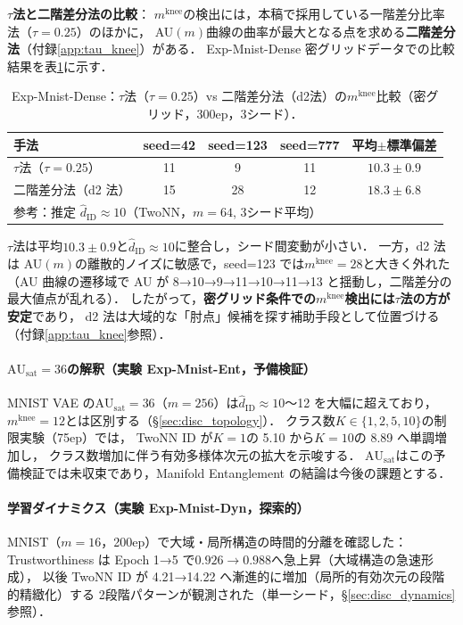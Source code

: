 \documentclass[11pt,a4paper]{jsarticle}
\newcommand{\AUsat}{\mathrm{AU}_{\mathrm{sat}}}
\newcommand{\mknee}{m^{\mathrm{knee}}}
\begin{document}
\noindent
\textbf{$\tau$法と二階差分法の比較}：
$\mknee$の検出には，本稿で採用している一階差分比率法（$\tau = 0.25$）のほかに，
AU$(m)$曲線の曲率が最大となる点を求める\textbf{二階差分法}（付録\ref{app:tau_knee}）がある．
Exp-Mnist-Dense 密グリッドデータでの比較結果を表\ref{tab:el_knee_compare}に示す．

\begin{table}[H]
\centering
\caption{Exp-Mnist-Dense：$\tau$法（$\tau=0.25$）vs 二階差分法（d2法）の$\mknee$比較（密グリッド，300ep，3シード）．}
\label{tab:el_knee_compare}
\small
\begin{tabular}{lcccc}
\toprule
手法 & seed=42 & seed=123 & seed=777 & 平均$\pm$標準偏差 \\
\midrule
$\tau$法（$\tau=0.25$） & 11 & 9  & 11 & $10.3 \pm 0.9$ \\
二階差分法（d2 法）     & 15 & 28 & 12 & $18.3 \pm 6.8$ \\
\midrule
\multicolumn{5}{l}{参考：推定 $\hat{d}_\mathrm{ID} \approx 10$（TwoNN，$m=64$, 3シード平均）} \\
\bottomrule
\end{tabular}
\end{table}

$\tau$法は平均$10.3 \pm 0.9$と$\hat{d}_\mathrm{ID} \approx 10$に整合し，シード間変動が小さい．
一方，d2 法は AU$(m)$の離散的ノイズに敏感で，seed=123 では$\mknee = 28$と大きく外れた
（AU 曲線の遷移域で AU が 8→10→9→11→10→11→13 と揺動し，二階差分の最大値点が乱れる）．
したがって，\textbf{密グリッド条件での$\mknee$検出には$\tau$法の方が安定}であり，
d2 法は大域的な「肘点」候補を探す補助手段として位置づける（付録\ref{app:tau_knee}参照）．

\paragraph{$\AUsat = 36$の解釈（実験 Exp-Mnist-Ent，予備検証）}
MNIST VAE の$\AUsat = 36$（$m=256$）は$\hat{d}_\mathrm{ID} \approx 10$〜12 を大幅に超えており，
$\mknee = 12$とは区別する（§\ref{sec:disc_topology}）．
クラス数$K \in \{1,2,5,10\}$の制限実験（75ep）では，
TwoNN ID が$K=1$の 5.10 から$K=10$の 8.89 へ単調増加し，
クラス数増加に伴う有効多様体次元の拡大を示唆する．
$\AUsat$はこの予備検証では未収束であり，Manifold Entanglement の結論は今後の課題とする．

\paragraph{学習ダイナミクス（実験 Exp-Mnist-Dyn，探索的）}
MNIST（$m=16$，200ep）で大域・局所構造の時間的分離を確認した：
Trustworthiness は Epoch 1→5 で$0.926 \to 0.988$へ急上昇（大域構造の急速形成），
以後 TwoNN ID が 4.21→14.22 へ漸進的に増加（局所的有効次元の段階的精緻化）する
2段階パターンが観測された（単一シード，§\ref{sec:disc_dynamics}参照）．
\end{document}
